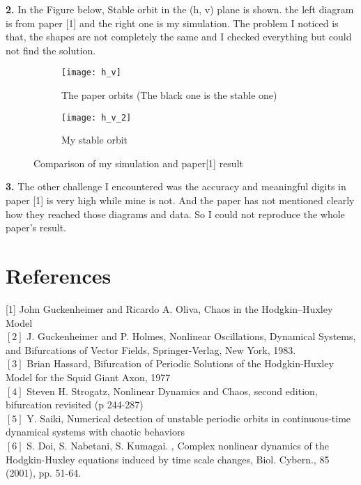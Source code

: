 \documentclass{article}
\begin{document}
		\textbf{2.} In the Figure below, Stable orbit in the (h, v) plane is shown. the left diagram is from paper [1] and the right one is my simulation. The problem I noticed is that, the shapes are not completely the same and I checked everything but could not find the solution. 
		
		\begin{figure}[H]
			\centering
			\begin{subfigure}{0.45\textwidth}
				\centering
				\texttt{[image: h\_v]}
				\caption{The paper orbits (The black one is the stable one)}  
				\label{fig:mean and std of net14}
			\end{subfigure}
			\hfill
			\begin{subfigure}{0.5\textwidth}  
				\centering 
				\texttt{[image: h\_v\_2]}
				\caption{My stable orbit}   
				\label{fig:mean and std of net24}
			\end{subfigure}
			\caption{Comparison of my simulation and paper[1] result} 
			\label{fig:mean and std nets}
		\end{figure}
		
		\textbf{3.} The other challenge I encountered was the accuracy and meaningful digits in paper [1] is very high while mine is not. And the paper has not mentioned clearly how they reached those diagrams and data. So I could not reproduce the whole paper's result. 
	\section{References}
		[1] John Guckenheimer and Ricardo A. Oliva, Chaos in the Hodgkin–Huxley Model
		\\
		$[2]$ J. Guckenheimer and P. Holmes, Nonlinear Oscillations, Dynamical Systems, and Bifurcations of
		Vector Fields, Springer-Verlag, New York, 1983. 
		\\
		$[3]$ Brian Hassard, Bifurcation of Periodic Solutions of the Hodgkin-Huxley Model for the Squid Giant Axon, 1977 
		\\
		$[4]$ Steven H. Strogatz, Nonlinear Dynamics and Chaos, second edition, bifurcation revisited (p 244-287)
		\\
		$[5]$ Y. Saiki, Numerical detection of unstable periodic orbits in continuous-time
		dynamical systems with chaotic behaviors
		\\
		$[6]$
		S. Doi, S. Nabetani, S. Kumagai. , Complex nonlinear dynamics of the Hodgkin-Huxley
		equations induced by time scale changes, Biol. Cybern., 85 (2001), pp. 51-64.
	
\end{document}
